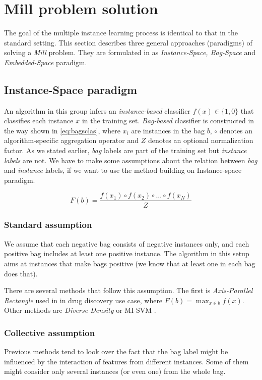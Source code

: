 \section{Mill problem solution}
The goal of the multiple instance learning process is identical to that in the standard setting. This section describes three general approaches (paradigms) of solving a \emph{Mill} problem. They are formulated in \cite{Amores2013} as \emph{Instance-Space, Bag-Space} and \emph{Embedded-Space} paradigm.

\subsection{Instance-Space paradigm}
An algorithm in this group infers an \emph{instance-based} classifier $f(x) \in \{1,0\}$ that classifies each instance $x$ in the training set. \emph{Bag-based} classifier is constructed in the way shown in \eqref{eq:bagsclas}, where $x_i$ are instances in the bag $b$, $\circ$ denotes an algorithm-specific aggregation operator and $Z$ denotes an optional normalization factor. As we stated earlier, \emph{bag} labels are part of the training set but \emph{instance labels} are not. We have to make some assumptions about the relation between \emph{bag} and \emph{instance} labels, if we want to use the method building on Instance-space paradigm.

\begin{equation} \label{eq:bagsclas}
    F(b)=\frac{f(x_1)\circ f(x_2)\circ\dots\circ f(x_N)}{Z}
\end{equation}

\subsubsection{Standard assumption}
We assume that each negative bag consists of negative instances only, and each positive bag includes at least one positive instance. The algorithm in this setup aims at instances that make bags positive (we know that at least one in each bag does that).

There are several methods that follow this assumption. The first is \emph{Axis-Parallel Rectangle} used in \cite{Dietterich1997} in drug discovery use case, where $F(b)=\max_{x\in b}f(x)$. Other methods are \emph{Diverse Density} \cite{Maron1998} or MI-SVM \cite{Andrews2003}.

\subsubsection{Collective assumption}
Previous methods tend to look over the fact that the bag label might be influenced by the interaction of features from different instances. Some of them might consider only several instances (or even one) from the whole bag.

